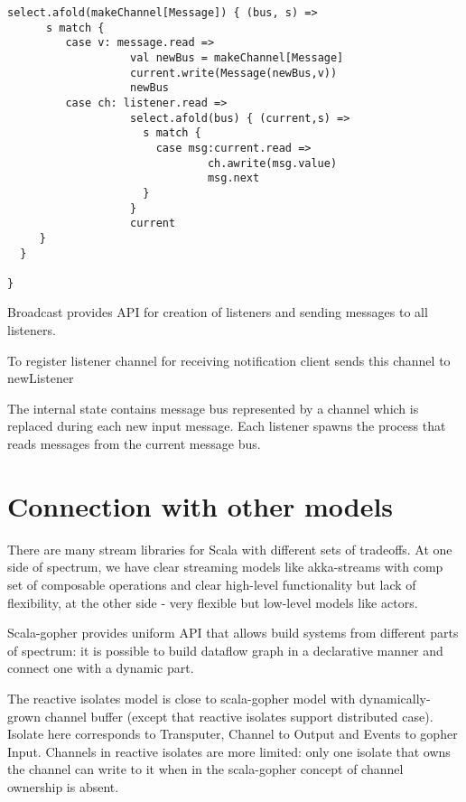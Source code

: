 \documentclass[12pt]{article}
\begin{document}
\begin{itemize}
\begin{Verbatim}[fontsize=\small]
   select.afold(makeChannel[Message]) { (bus, s) =>
      s match {
         case v: message.read =>
                   val newBus = makeChannel[Message]
                   current.write(Message(newBus,v))
                   newBus
         case ch: listener.read =>          
                   select.afold(bus) { (current,s) =>
                     s match {
                       case msg:current.read =>
                               ch.awrite(msg.value) 
                               msg.next
                     }
                   } 
                   current
     } 
  }

}
\end{Verbatim}

 Broadcast provides API for creation of listeners and sending messages to all listeners.

To register listener channel for receiving notification client sends this channel to newListener
  
 The internal state contains message bus represented by a channel which is replaced during each new input message. Each listener spawns the process that reads messages from the current message bus.


\end{itemize}

 
\section{ Connection with other models }

 There are many stream libraries for Scala with different sets of tradeoffs. At one side of
spectrum, we have clear streaming models like akka-streams\cite{akka-streams} with comp set
of composable operations and clear high-level functionality but lack of flexibility,
at the other side - very flexible but low-level models like actors.

 Scala-gopher provides uniform API that allows build systems from different parts of spectrum:
it is possible to build dataflow graph in a declarative manner and connect one with a dynamic part.

 The reactive isolates model\cite{Prokopec:2015:ICE:2814228.2814245} is close to scala-gopher model with dynamically-grown channel buffer (except that reactive isolates support distributed case).
 Isolate here corresponds to Transputer, Channel to Output and Events to gopher Input. Channels in reactive isolates are more limited: only one isolate that owns the channel can write to it when in the scala-gopher concept of channel ownership is absent. 
\end{document}

